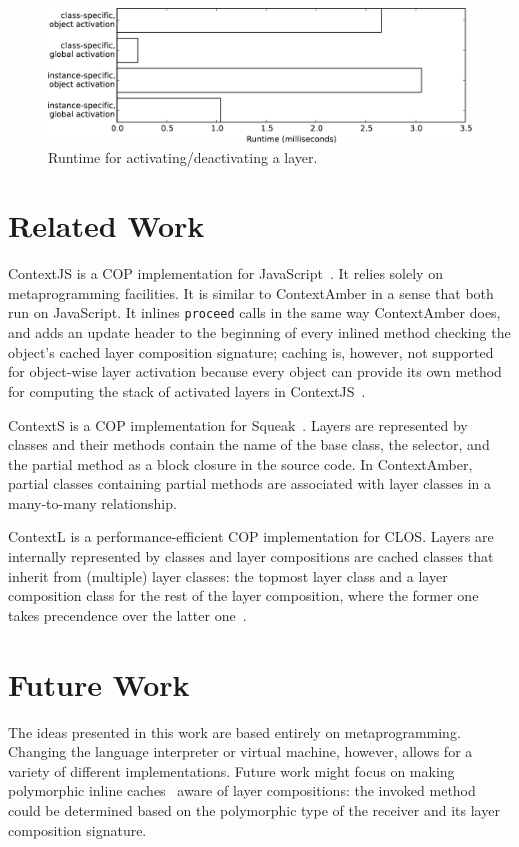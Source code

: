 \documentclass{sig-alternate}
\begin{document}
\begin{figure}[t]
    \includegraphics[width=\columnwidth]{activation_ms.pdf}
    \caption{Runtime for activating/deactivating a layer.}
    \label{fig:activation}
\end{figure}

\section{Related Work}
ContextJS is a COP implementation for JavaScript~\cite{Lincke:2011:OIC:1998661.1998804}. It relies solely on metaprogramming facilities. It is similar to ContextAmber in a sense that both run on JavaScript. It inlines \texttt{proceed} calls in the same way ContextAmber does, and adds an update header to the beginning of every inlined method checking the object's cached layer composition signature; caching is, however, not supported for object-wise layer activation because every object can provide its own method for computing the stack of activated layers in ContextJS~\cite{Krahn:2012:ELA:2223947.2223971}.

ContextS is a COP implementation for Squeak~\cite{Hirschfeld:2007:ICP:1462618.1462629}. Layers are represented by classes and their methods contain the name of the base class, the selector, and the partial method as a block closure in the source code. In ContextAmber, partial classes containing partial methods are associated with layer classes in a many-to-many relationship.

ContextL is a performance-efficient COP implementation for CLOS. Layers are internally represented by classes and layer compositions are cached classes that inherit from (multiple) layer classes: the topmost layer class and a layer composition class for the rest of the layer composition, where the former one takes precendence over the latter one~\cite{Costanza:2006:ELA:2111746.2111753}.

\section{Future Work}
The ideas presented in this work are based entirely on metaprogramming. Changing the language interpreter or virtual machine, however, allows for a variety of different implementations. Future work might focus on making polymorphic inline caches~\cite{Holzle:1991:ODO:646149.679193} aware of layer compositions: the invoked method could be determined based on the polymorphic type of the receiver and its layer composition signature.
\end{document}
